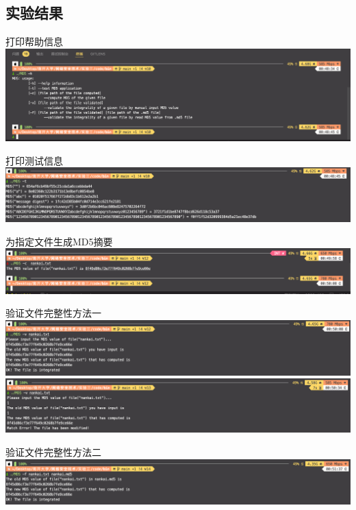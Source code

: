 \documentclass[UTF8,a4paper,10pt]{ctexart}
\begin{document}
\subsection{实验结果}
\begin{center}
    打印帮助信息
    \includegraphics*[scale = 0.3]{1}

    打印测试信息
    \includegraphics*[scale = 0.3]{2}

    为指定文件生成MD5摘要
    \includegraphics*[scale = 0.3]{3}

    验证文件完整性方法一
    \includegraphics*[scale = 0.3]{4}
    \includegraphics*[scale = 0.3]{5}

    验证文件完整性方法二
    \includegraphics*[scale = 0.3]{6}
\end{center}
\end{document}
